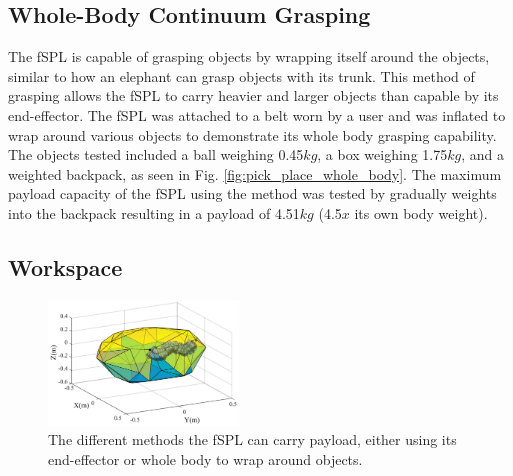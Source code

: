\documentclass[letterpaper, 10 pt, conference]{ieeeconf}  %
\begin{document}


\subsection{Whole-Body Continuum Grasping}

The fSPL is capable of grasping objects by wrapping itself around the objects, similar to how an elephant can grasp objects with its trunk. This method of grasping allows the fSPL to carry heavier and larger objects than capable by its end-effector. The fSPL was attached to a belt worn by a user and was inflated to wrap around various objects to demonstrate its whole body grasping capability. The objects tested included a ball weighing 0.45$kg$, a box weighing 1.75$kg$, and a weighted backpack, as seen in Fig. \ref{fig:pick_place_whole_body}. The maximum payload capacity of the fSPL using the method was tested by gradually weights into the backpack resulting in a payload of 4.51$kg$ (4.5$x$ its own body weight).


\subsection{Workspace}
\begin{figure}[t!]
\centering
\includegraphics[width=0.45\textwidth]{Figures/Workspace_Fabric_ARM}
\caption{The different methods the fSPL can carry payload, either using its end-effector or whole body to wrap around objects.}
\label{fig:workspace_fabric_arm}
\vspace{-1.5em}
\end{figure}
\end{document}
